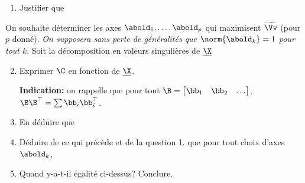 \documentclass[11pt]{article}
\begin{document}
\begin{enumerate}
	\item Justifier que 
%	
%	
\end{enumerate}

\noindent On souhaite déterminer les axes $\abold_1, \ldots, \abold_p$ qui maximisent $\widetilde{\Vv}$ (pour $p$ donné). \textit{On supposera sans perte de généralités que $\norm{\abold_k} = 1$ pour tout $k$}. Soit la décomposition en valeurs singulières de $\underline{\X}$

\begin{enumerate}
\setcounter{enumi}{1}

	\item Exprimer $\C$ en fonction de $\underline{\X}$.
	
	\noindent \textbf{Indication:} on rappelle que pour tout $\B = \begin{bmatrix} \bb_1 & \bb_2 & \ldots \end{bmatrix}$, $\B\B^\top = \sum \bb_i \bb_i^\top$.
\item En déduire que 
\item Déduire de ce qui précède et de la question 1. que pour tout choix d'axes $\abold_k$,

\item Quand y-a-t-il égalité ci-dessus? Conclure.
\end{enumerate}
\end{document}
